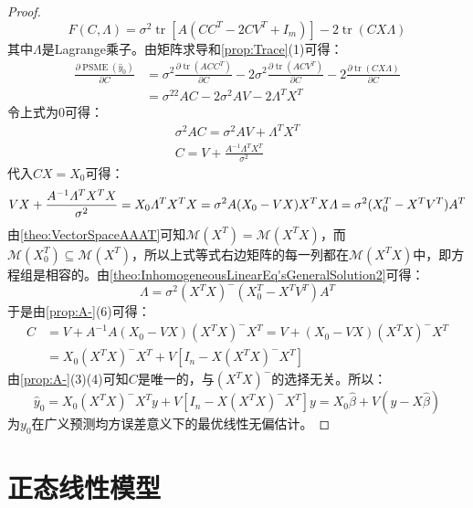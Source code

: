 \begin{proof}
\begin{equation*}
		F(C,\varLambda)=\sigma^2\operatorname{tr}[A(CC^T-2CV^T+I_m)]-2\operatorname{tr}(CX\varLambda)
	\end{equation*}
	其中$\varLambda$是Lagrange乘子。由矩阵求导和\cref{prop:Trace}(1)可得：
	\begin{align*}
		\frac{\partial\operatorname{PSME}(\hat{y}_0)}{\partial C}&=\sigma^2\frac{\partial\operatorname{tr}(ACC^T)}{\partial C}-2\sigma^2\frac{\partial\operatorname{tr}(ACV^T)}{\partial C}-2\frac{\partial\operatorname{tr}(CX\varLambda)}{\partial C} \\
		&=\sigma^22AC-2\sigma^2AV-2\varLambda^TX^T
	\end{align*}
	令上式为$0$可得：
	\begin{gather*}
		\sigma^2AC=\sigma^2AV+\varLambda^TX^T \\
		C=V+\frac{A^{-1}\varLambda^TX^T}{\sigma^2}
	\end{gather*}
	代入$CX=X_0$可得：
	\begin{equation*}
		VX+\frac{A^{-1}\varLambda^TX^TX}{\sigma^2}=X_0 \\
		\varLambda^TX^TX=\sigma^2A(X_0-VX) \\
		X^TX\varLambda=\sigma^2(X_0^T-X^TV^T)A^T
	\end{equation*}
	由\cref{theo:VectorSpaceAAAT}可知$\mathcal{M}(X^T)=\mathcal{M}(X^TX)$，而$\mathcal{M}(X_0^T)\subseteq\mathcal{M}(X^T)$，所以上式等式右边矩阵的每一列都在$\mathcal{M}(X^TX)$中，即方程组是相容的。由\cref{theo:InhomogeneousLinearEq'sGeneralSolution2}可得：
	\begin{equation*}
		\varLambda=\sigma^2(X^TX)^-(X_0^T-X^TV^T)A^T
	\end{equation*}
	于是由\cref{prop:A-}(6)可得：
	\begin{align*}
		C&=V+A^{-1}A(X_0-VX)(X^TX)^-X^T=V+(X_0-VX)(X^TX)^-X^T \\
		&=X_0(X^TX)^-X^T+V[I_n-X(X^TX)^-X^T]
	\end{align*}
	由\cref{prop:A-}(3)(4)可知$C$是唯一的，与$(X^TX)^-$的选择无关。所以：
	\begin{equation*}
		\hat{y}_0=X_0(X^TX)^-X^Ty+V[I_n-X(X^TX)^-X^T]y=X_0\hat{\beta}+V(y-X\hat{\beta})
	\end{equation*}
	为$y_0$在广义预测均方误差意义下的最优线性无偏估计。
\end{proof}



\section{正态线性模型}
